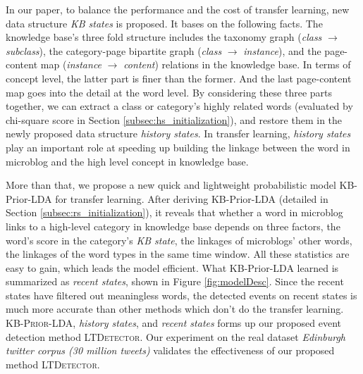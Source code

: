 \documentclass{article}
\begin{document}
In our paper, to balance the performance and the cost of transfer learning, new data structure \textit{KB states} is proposed. 
It bases on the following facts. 
The knowledge base's three fold structure includes the taxonomy graph (\textit{class} \(\rightarrow\) \textit{subclass}), the category-page bipartite graph (\textit{class} \(\rightarrow\) \textit{instance}), and the page-content map (\textit{instance} \(\rightarrow\) \textit{content}) relations in the knowledge base. 
In terms of concept level, the latter part is finer than the former. 
And the last page-content map goes into the detail at the word level. 
By considering these three parts together, we can extract a class or category's highly related words (evaluated by chi-square score in Section \ref{subsec:hs_initialization}), and restore them in the newly proposed data structure \textit{history states}.
In transfer learning, \textit{history states} play an important role at speeding up building the linkage between the word in microblog and the high level concept in knowledge base. 

More than that, we propose a new quick and lightweight probabilistic model KB-Prior-LDA for transfer learning. 
After deriving KB-Prior-LDA (detailed in Section \ref{subsec:rs_initialization}), it reveals that whether a word in microblog links to a high-level category in knowledge base depends on three factors, the word's score in the category's \textit{KB state}, the linkages of microblogs' other words, the linkages of the word types in the same time window. 
All these statistics are easy to gain, which leads the model efficient. 
What KB-Prior-LDA learned is summarized as \textit{recent states}, shown in Figure \ref{fig:modelDesc}.
Since the recent states have filtered out meaningless words, the detected events on recent states is much more accurate than other methods which don't do the transfer learning.
\textsc{KB-Prior-LDA}, \textit{history states}, and \textit{recent states} forms up our proposed event detection method \textsc{LTDetector}.
Our experiment on the real dataset \textit{Edinburgh twitter corpus (30 million tweets)} validates the effectiveness of our proposed method \textsc{LTDetector}.
\end{document}
